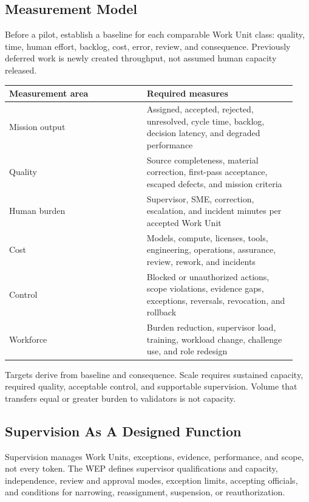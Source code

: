 \documentclass[11pt]{article}
\begin{document}
\hypertarget{91-measurement-model}{%
\subsection{Measurement Model}\label{91-measurement-model}}

Before a pilot, establish a baseline for each comparable Work Unit
class: quality, time, human effort, backlog, cost, error, review, and
consequence. Previously deferred work is newly created throughput, not
assumed human capacity released.

\begingroup\footnotesize\setlength{\tabcolsep}{3pt}\begin{longtable}{p{0.45\linewidth}p{0.49\linewidth}}
\toprule\noalign{}
Measurement area & Required measures \\
\midrule\noalign{}
\endhead
\bottomrule\noalign{}
\endlastfoot
Mission output & Assigned, accepted, rejected, unresolved, cycle time,
backlog, decision latency, and degraded performance \\
Quality & Source completeness, material correction, first-pass
acceptance, escaped defects, and mission criteria \\
Human burden & Supervisor, SME, correction, escalation, and incident
minutes per accepted Work Unit \\
Cost & Models, compute, licenses, tools, engineering, operations,
assurance, review, rework, and incidents \\
Control & Blocked or unauthorized actions, scope violations, evidence
gaps, exceptions, reversals, revocation, and rollback \\
Workforce & Burden reduction, supervisor load, training, workload
change, challenge use, and role redesign \\
\end{longtable}\endgroup

Targets derive from baseline and consequence. Scale requires sustained
capacity, required quality, acceptable control, and supportable
supervision. Volume that transfers equal or greater burden to validators
is not capacity.

\hypertarget{92-supervision-as-a-designed-function}{%
\subsection{Supervision As A Designed
Function}\label{92-supervision-as-a-designed-function}}

Supervision manages Work Units, exceptions, evidence, performance, and
scope, not every token. The WEP defines supervisor qualifications and
capacity, independence, review and approval modes, exception limits,
accepting officials, and conditions for narrowing, reassignment,
suspension, or reauthorization.
\end{document}
